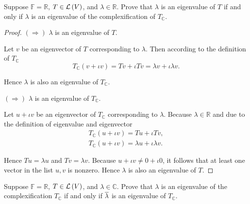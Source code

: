 \begin{exercise}\label{chapter5:sectionA:exercise17}
    Suppose $\mathbb{F} = \mathbb{R}$, $T\in\mathcal{L}\left({V}\right)$, and $\lambda\in\mathbb{R}$. Prove that $\lambda$ is an eigenvalue of $T$ if and only if $\lambda$ is an eigenvalue of the complexification of $T_{\mathbb{C}}$.
\end{exercise}

\begin{proof}
    $(\Rightarrow)$ $\lambda$ is an eigenvalue of $T$.

    Let $v$ be an eigenvector of $T$ corresponding to $\lambda$. Then according to the definition of $T_{\mathbb{C}}$
    \[
        T_{\mathbb{C}}(v + \iota v) = Tv + \iota Tv = \lambda v + \iota \lambda v.
    \]

    Hence $\lambda$ is also an eigenvalue of $T_{\mathbb{C}}$.

    $(\Rightarrow)$ $\lambda$ is an eigenvalue of $T_{\mathbb{C}}$.

    Let $u + \iota v$ be an eigenvector of $T_{\mathbb{C}}$ corresponding to $\lambda$. Because $\lambda\in\mathbb{R}$ and due to the definition of eigenvalue and eigenvector
    \[
        \begin{split}
            T_{\mathbb{C}}(u + \iota v) = Tu + \iota Tv, \\
            T_{\mathbb{C}}(u + \iota v) = \lambda u + \iota \lambda v.
        \end{split}
    \]

    Hence $Tu = \lambda u$ and $Tv = \lambda v$. Because $u + \iota v\ne 0 + \iota 0$, it follows that at least one vector in the list $u, v$ is nonzero. Hence $\lambda$ is also an eigenvalue of $T$.
\end{proof}
\newpage

\begin{exercise}
    Suppose $\mathbb{F} = \mathbb{R}$, $T\in\mathcal{L}\left({V}\right)$, and $\lambda\in\mathbb{C}$. Prove that $\lambda$ is an eigenvalue of the complexification $T_{\mathbb{C}}$ if and only if $\overline{\lambda}$ is an eigenvalue of $T_{\mathbb{C}}$.
\end{exercise}

